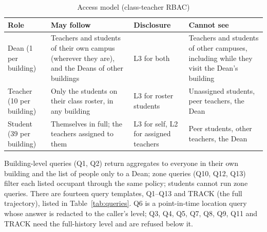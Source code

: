 \documentclass[12pt,a4paper,oneside]{report}
\begin{document}
\begin{table}[htbp]
\centering
\caption{Access model (class-teacher RBAC)}\label{tab:access}
{\small\setlength{\tabcolsep}{4pt}\renewcommand{\arraystretch}{1.2}
\begin{tabular}{|p{2.49cm}|p{5.36cm}|p{2.87cm}|p{3.25cm}|}\hline
\textbf{Role} & \textbf{May follow} & \textbf{Disclosure} & \textbf{Cannot see}\\\hline
Dean (1 per building) & Teachers and students of their own campus (wherever they are), and the Deans of other buildings & L3 for both & Teachers and students of other campuses, including while they visit the Dean's building\\\hline
Teacher (10 per building) & Only the students on their class roster, in any building & L3 for roster students & Unassigned students, peer teachers, the Dean\\\hline
Student (39 per building) & Themselves in full; the teachers assigned to them & L3 for self, L2 for assigned teachers & Peer students, other teachers, the Dean\\\hline
\end{tabular}}
\end{table}

Building-level queries (Q1, Q2) return aggregates to everyone in their own building and the list of people only to a Dean; zone queries (Q10, Q12, Q13) filter each listed occupant through the same policy; students cannot run zone queries. There are fourteen query templates, Q1--Q13 and TRACK (the full trajectory), listed in Table~\ref{tab:queries}. Q6 is a point-in-time location query whose answer is redacted to the caller's level; Q3, Q4, Q5, Q7, Q8, Q9, Q11 and TRACK need the full-history level and are refused below it.
\end{document}
